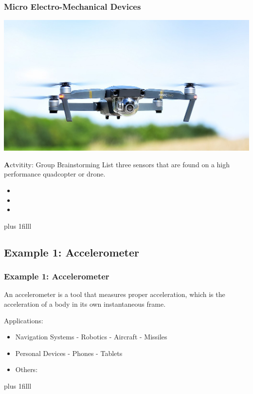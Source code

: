 \documentclass[fleqn]{beamer} %
\newcommand{\sectionIIsubsectionIItitle}{Micro Electro-Mechanical Devices}
\newcommand{\sectionIIsubsectionIIItitle}{Example 1: Accelerometer}
\newcommand{\btVFill}{\vskip0pt plus 1filll}
\begin{document}
			\begin{frame}
				\frametitle{\sectionIIsubsectionIItitle}


				\includegraphics[scale=0.2]{images/Flying_DJI_Mavic_Pro_cropped.jpg}
	
				{\textbf Actvitity:} Group Brainstorming
				List three sensors that are found on a high performance quadcopter or drone.
				\begin{itemize}
					\item
					\item
					\item
				\end{itemize} 

			 	\btVFill


			\end{frame}



		\subsection{\sectionIIsubsectionIIItitle}\label{sectionIIsubsectionIII}

			\begin{frame}
				\frametitle{\sectionIIsubsectionIIItitle}
				An accelerometer is a tool that measures proper acceleration, which is the acceleration of a body in its own instantaneous frame.

				Applications:
				\begin{itemize}
					\item Navigation Systems - Robotics - Aircraft - Missiles
					\item Personal Devices - Phones - Tablets
					\item Others:
				\end{itemize}                                

				\btVFill
				
			\end{frame}
\end{document}
